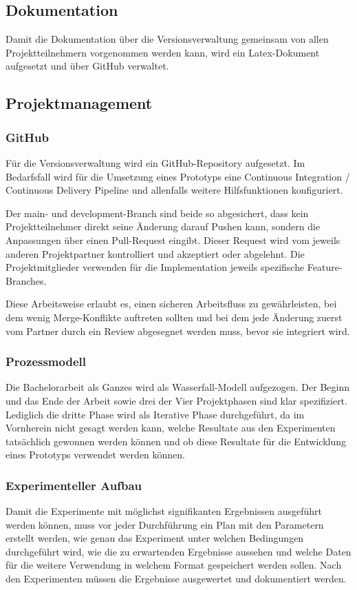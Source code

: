 \subsection*{Dokumentation}
Damit die Dokumentation über die Versionsverwaltung gemeinsam von allen 
Projektteilnehmern vorgenommen werden kann, wird ein Latex-Dokument 
aufgesetzt und über GitHub verwaltet.

\subsection*{Projektmanagement}
\subsubsection*{GitHub}
Für die Versionsverwaltung wird ein GitHub-Repository aufgesetzt. 
Im Bedarfsfall wird für die Umsetzung eines Prototyps eine Continuous 
Integration / Continuous Delivery Pipeline und allenfalls weitere 
Hilfsfunktionen konfiguriert.

Der main- und development-Branch sind beide so abgesichert, 
dass kein Projektteilnehmer direkt seine Änderung darauf Pushen kann, 
sondern die Anpassungen über einen Pull-Request eingibt. 
Dieser Request wird vom jeweils anderen Projektpartner kontrolliert 
und akzeptiert oder abgelehnt. Die Projektmitglieder verwenden für die 
Implementation jeweils spezifische Feature-Branches.

Diese Arbeitsweise erlaubt es, einen sicheren Arbeitsfluss zu gewährleisten, 
bei dem wenig Merge-Konflikte auftreten sollten und bei dem jede Änderung 
zuerst vom Partner durch ein Review abgesegnet werden muss, 
bevor sie integriert wird.

\subsubsection*{Prozessmodell}
Die Bachelorarbeit als Ganzes wird als Wasserfall-Modell aufgezogen. 
Der Beginn und das Ende der Arbeit sowie drei der Vier Projektphasen 
sind klar spezifiziert. 
Lediglich die dritte Phase wird als Iterative Phase durchgeführt, 
da im Vornherein nicht gesagt werden kann,
welche Resultate aus den Experimenten tatsächlich gewonnen werden können 
und ob diese Resultate für die Entwicklung eines Prototyps verwendet werden
können.

\clearpage 

\subsubsection*{Experimenteller Aufbau}
Damit die Experimente mit möglichst signifikanten Ergebnissen ausgeführt 
werden können, muss vor jeder Durchführung ein Plan mit den Parametern 
erstellt werden, wie genau das Experiment unter welchen Bedingungen 
durchgeführt wird, wie die zu erwartenden Ergebnisse aussehen und welche
Daten für die weitere Verwendung in welchem Format gespeichert werden sollen.
Nach den Experimenten müssen die Ergebnisse ausgewertet und dokumentiert werden. 